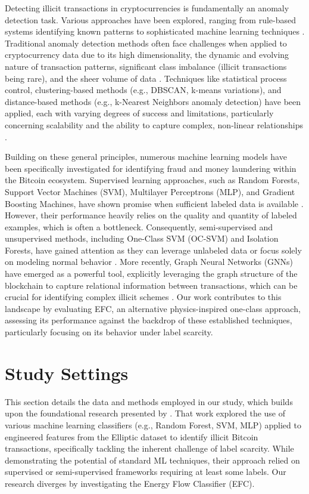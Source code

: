 \documentclass[12pt]{article}
\begin{document}
Detecting illicit transactions in cryptocurrencies is fundamentally an anomaly detection task. Various approaches have been 
explored, ranging from rule-based systems identifying known patterns to sophisticated machine learning techniques
\cite{samariya2023comprehensive, li2023survey}.
Traditional anomaly detection methods often face challenges when applied to cryptocurrency data due to its high dimensionality,
the dynamic and evolving nature of transaction patterns, significant class imbalance (illicit transactions being rare), and
the sheer volume of data \cite{pallathadka2022cryptocurrency}. Techniques like statistical process control, clustering-based
methods (e.g., DBSCAN, k-means variations), and distance-based methods (e.g., k-Nearest Neighbors anomaly detection)
have been applied, each with varying degrees of success and limitations, particularly concerning scalability and the ability
to capture complex, non-linear relationships \cite{hilal2022financial}.

Building on these general principles, numerous machine learning models have been specifically investigated for identifying
fraud and money laundering within the Bitcoin ecosystem. Supervised learning approaches, such as Random Forests, Support
Vector Machines (SVM), Multilayer Perceptrons (MLP), and Gradient Boosting Machines, have shown promise when sufficient
labeled data is available \cite{lorenz2021machinelearningmethodsdetect, chen2021bitcoin}. However, their performance heavily
relies on the quality and quantity of labeled examples, which is often a bottleneck. Consequently, semi-supervised and
unsupervised methods, including One-Class SVM (OC-SVM) and Isolation Forests, have gained attention as they can leverage
unlabeled data or focus solely on modeling normal behavior \cite{lorenz2021machinelearningmethodsdetect, kehinde2024machine}.
More recently, Graph Neural Networks (GNNs) have emerged as a powerful tool, explicitly leveraging the graph structure of
the blockchain to capture relational information between transactions, which can be crucial for identifying complex illicit
schemes \cite{weber2019antimoneylaunderingbitcoinexperimenting}. Our work contributes to this landscape by evaluating
EFC, an alternative physics-inspired one-class approach, assessing its performance against the backdrop of these established
techniques, particularly focusing on its behavior under label scarcity.

\section{Study Settings} \label{sec:methods}
This section details the data and methods employed in our study, which builds upon the foundational research presented
by \cite{lorenz2021machinelearningmethodsdetect}. That work explored the use of various machine learning classifiers
(e.g., Random Forest, SVM, MLP) applied to engineered features from the Elliptic dataset to identify illicit Bitcoin transactions,
specifically tackling the inherent challenge of label scarcity. While demonstrating the potential of standard ML techniques,
their approach relied on supervised or semi-supervised frameworks requiring at least some labels. Our research
diverges by investigating the Energy Flow Classifier (EFC). 
\end{document}
